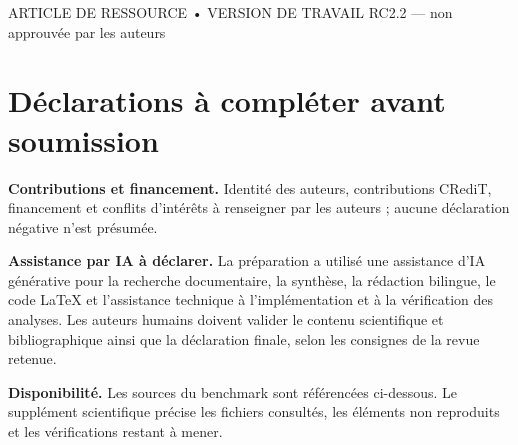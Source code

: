 \documentclass[10pt,a4paper]{article}
\begin{document}
\thispagestyle{empty}
\begin{center}
{\small ARTICLE DE RESSOURCE • VERSION DE TRAVAIL RC2.2 — non approuvée par les auteurs\par}
\vspace{10pt}
{\LARGE\bfseries\PaperTitle\par}
\vspace{12pt}
{\normalsize\PaperAuthors\par}
\vspace{3pt}
{\small\itshape\PaperAffiliation\par}
\end{center}
\vspace{8pt}
\begin{abstract}

\end{abstract}
\vspace{10pt}

\section*{Déclarations à compléter avant soumission}
\noindent\textbf{Contributions et financement.} Identité des auteurs, contributions CRediT, financement et conflits d'intérêts à renseigner par les auteurs ; aucune déclaration négative n'est présumée.\par
\noindent\textbf{Assistance par IA à déclarer.} La préparation a utilisé une assistance d'IA générative pour la recherche documentaire, la synthèse, la rédaction bilingue, le code LaTeX et l'assistance technique à l'implémentation et à la vérification des analyses. Les auteurs humains doivent valider le contenu scientifique et bibliographique ainsi que la déclaration finale, selon les consignes de la revue retenue.\par
\noindent\textbf{Disponibilité.} Les sources du benchmark sont référencées ci-dessous. Le supplément scientifique précise les fichiers consultés, les éléments non reproduits et les vérifications restant à mener.


\end{document}
